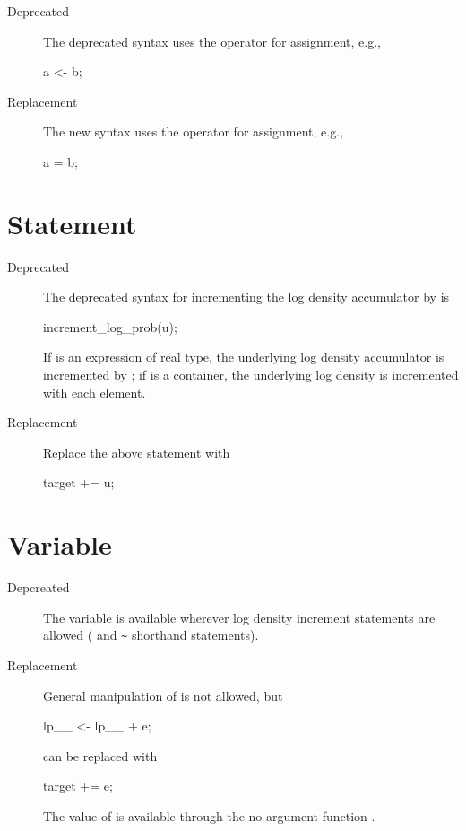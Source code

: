 \begin{description}
\item[Deprecated] The deprecated syntax uses the operator \code{<-}
  for assignment, e.g.,
\begin{stancode}
a <- b;
\end{stancode}
\item[Replacement] The new syntax uses the operator \code{=} for
  assignment, e.g.,
\begin{stancode}
a = b;
\end{stancode}
\end{description}

\section{ Statement}

\begin{description}
\item[Deprecated] The deprecated syntax for incrementing the log
  density accumulator by  is
\begin{stancode}
increment_log_prob(u);
\end{stancode}
If  is an expression of real type, the underlying log density
accumulator is incremented by ;  if  is a container,
the underlying log density is incremented with each element.
\item[Replacement] Replace the above statement with
\begin{stancode}
target += u;
\end{stancode}
\end{description}

\section{ Variable}

\begin{description}
\item[Depcreated]
The variable  is available wherever log density increment
statements are allowed ( and \Verb|~| shorthand
statements).
\item[Replacement]
General manipulation of  is not allowed, but
\begin{stancode}
lp__ <- lp__ + e;
\end{stancode}
%
can be replaced with
%
\begin{stancode}
target += e;
\end{stancode}
%
The value of  is available through the no-argument
function .
\end{description}

